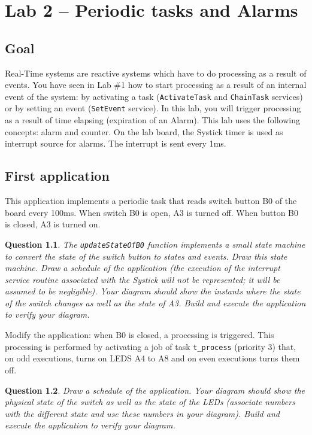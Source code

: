\documentclass[11pt]{report}
\newtheorem{ex}{Question}
\begin{document}
\chapter{Lab 2 -- Periodic tasks and Alarms}

\section{Goal}

Real-Time systems are reactive systems which have to do processing as a result of events. You have seen in Lab \#1 how to start processing as a result of an internal event of the system: by activating a task (\texttt{ActivateTask} and \texttt{ChainTask} services) or by setting an event (\texttt{SetEvent} service). In this lab, you will trigger processing as a result of time elapsing (expiration of an Alarm). This lab uses the following concepts: alarm and counter. On the lab board, the Systick timer is used as interrupt source for alarms. The interrupt is sent every 1ms.

\section{First application}

This application implements a periodic task that reads switch button B0 of the board every 100ms.
When switch B0 is open, A3 is turned off.
When button B0 is closed, A3 is turned on.

\begin{ex}
    The \texttt{updateStateOfB0} function implements a small state machine to convert the state of the switch button to states and events.
    Draw this state machine.
    Draw a schedule of the application (the execution of the interrupt service routine associated with the Systick will not be represented; it will be assumed to be negligible).
    Your diagram should show the instants where the state of the switch changes as well as the state of A3.
    Build and execute the application to verify your diagram.
\end{ex}

Modify the application: when B0 is closed, a processing is triggered.
This processing is performed by activating a job of task \texttt{t_process} (priority 3) that, on odd executions, turns on LEDS A4 to A8 and on even executions turns them off.
\begin{ex}
Draw a schedule of the application.
Your diagram should show the physical state of the switch as well as the state of the LEDs (associate numbers with the different state and use these numbers in your diagram).
Build and execute the application to verify your diagram.
\end{ex}
\end{document}
